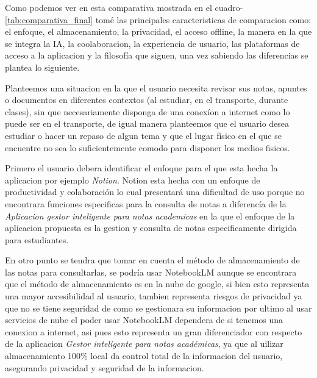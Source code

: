 \noindent Como podemos ver en esta comparativa mostrada en el cuadro-\ref{tab:comparativa_final} tomé las principales caracteristicas de comparacion como: el enfoque, el almacenamiento, la privacidad, el acceso offline, la manera en la que se integra la IA, la coolaboracion, la experiencia de usuario, las plataformas de acceso a la aplicacion y la filosofía que siguen, una vez sabiendo las diferencias se plantea lo siguiente.

\vspace{.5cm}

\noindent Planteemos una situacion en la que el usuario necesita revisar sus notas, apuntes o documentos en diferentes contextos (al estudiar, en el transporte, durante clases), sin que necesariamente disponga de una conexíon a internet como lo puede ser en el transporte, de igual manera planteemos que el usuario desea estudiar o hacer un repaso de algun tema y que el lugar físico en el que se encuentre no sea lo suficientemente comodo para disponer los medios fisicos. 

\vspace{.5cm}

\noindent Primero el usuario debera identificar el enfoque para el que esta hecha la aplicacion por ejemplo \textit{Notion}. Notion esta hecha con un enfoque de productividad y colaboración lo cual presentará una dificultad de uso porque no encontrara funciones especificas para la consulta de notas a diferencía de la \textit{Aplicacion gestor inteligente para notas academicas} en la que el enfoque de la aplicacion propuesta es la gestion y consulta de notas especificamente dirigida para estudiantes. 

\vspace{.5cm}

\noindent En otro punto se tendra que tomar en cuenta el método de almacenamiento de las notas para consultarlas, se podría usar NotebookLM aunque se encontrara que el método de almacenamiento es en la nube de google, si bien esto representa una mayor accesibilidad al usuario, tambien representa riesgos de privacidad ya que no se tiene seguridad de como se  gestionara su informacion por ultimo al usar servicios de nube el poder usar NotebookLM dependera de si tenemos una conexion a internet, asi pues esto representa un gran diferenciador con respecto de la aplicacion \textit{Gestor inteligente para notas académicas}, ya que al uilizar almacenamiento 100\% local da control total de la informacion del usuario, asegurando privacidad y seguridad de la informacion. 

